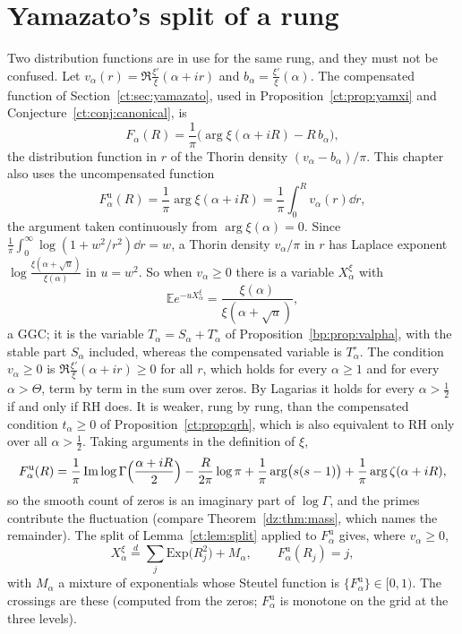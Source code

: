 \section{Yamazato's split of a rung}\label{lg:sec:split}
Two distribution functions are in use for the same rung, and they must not be confused. Let $v_\alpha(r)=\Re\frac{\xi'}{\xi}(\alpha+ir)$ and $b_\alpha=\frac{\xi'}{\xi}(\alpha)$. The compensated function of Section~\ref{ct:sec:yamazato}, used in Proposition~\ref{ct:prop:yamxi} and Conjecture~\ref{ct:conj:canonical}, is
\[
F_\alpha(R)=\frac1\pi\bigl(\arg\xi(\alpha+iR)-R\,b_\alpha\bigr),
\]
the distribution function in $r$ of the Thorin density $(v_\alpha-b_\alpha)/\pi$. This chapter also uses the uncompensated function
\[
F^{\mathrm u}_\alpha(R)=\frac1\pi\arg\xi(\alpha+iR)=\frac1\pi\int_0^Rv_\alpha(r)\dd r ,
\]
the argument taken continuously from $\arg\xi(\alpha)=0$. Since $\frac1\pi\int_0^\infty\log(1+w^2/r^2)\dd r=w$, a Thorin density $v_\alpha/\pi$ in $r$ has Laplace exponent $\log\frac{\xi(\alpha+\sqrt u)}{\xi(\alpha)}$ in $u=w^2$. So when $v_\alpha\ge0$ there is a variable $X^\xi_\alpha$ with
\[
\mathbb Ee^{-uX^\xi_\alpha}=\frac{\xi(\alpha)}{\xi(\alpha+\sqrt u)},
\]
a GGC; it is the variable $T_\alpha=S_\alpha+T_\alpha^\circ$ of Proposition~\ref{bp:prop:valpha}, with the stable part $S_\alpha$ included, whereas the compensated variable is $T^\circ_\alpha$. The condition $v_\alpha\ge0$ is $\Re\frac{\xi'}{\xi}(\alpha+ir)\ge0$ for all $r$, which holds for every $\alpha\ge1$ and for every $\alpha>\Theta$, term by term in the sum over zeros. By Lagarias \cite{Lagarias} it holds for every $\alpha>\frac12$ if and only if RH does. It is weaker, rung by rung, than the compensated condition $t_\alpha\ge0$ of Proposition~\ref{ct:prop:qrh}, which is also equivalent to RH only over all $\alpha>\frac12$. Taking arguments in the definition of $\xi$,
\[
F^{\mathrm u}_\alpha(R)=\frac1\pi\Im\log\Gamma\Bigl(\frac{\alpha+iR}2\Bigr)-\frac R{2\pi}\log\pi+\frac1\pi\arg\bigl(s(s-1)\bigr)+\frac1\pi\arg\zeta(\alpha+iR),
\]
so the smooth count of zeros is an imaginary part of $\log\Gamma$, and the primes contribute the fluctuation (compare Theorem~\ref{dz:thm:mass}, which names the remainder). The split of Lemma~\ref{ct:lem:split} applied to $F^{\mathrm u}_\alpha$ gives, where $v_\alpha\ge0$,
\[
X^\xi_\alpha\overset d=\sum_j\mathrm{Exp}\bigl(R_j^2\bigr)+M_\alpha,\qquad F^{\mathrm u}_\alpha(R_j)=j,
\]
with $M_\alpha$ a mixture of exponentials whose Steutel function is $\{F^{\mathrm u}_\alpha\}\in[0,1)$. The crossings are these (computed from the zeros; $F^{\mathrm u}_\alpha$ is monotone on the grid at the three levels).
